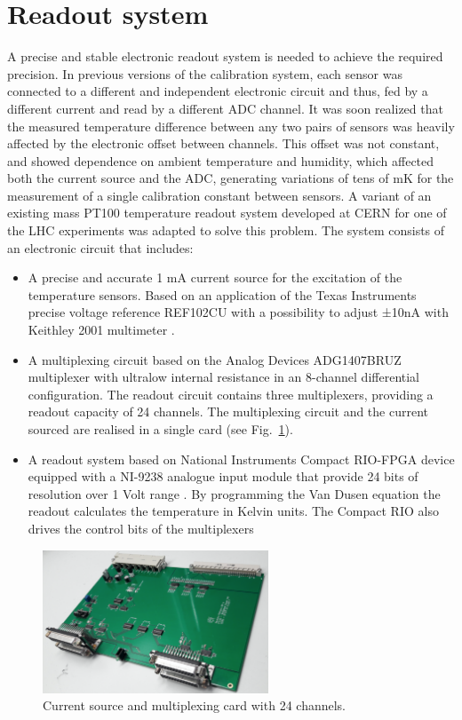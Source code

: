 \section{Readout system}
\label{sec:readout}
A precise and stable electronic readout system is needed to achieve the required precision. In previous versions of the calibration system, each sensor was connected to a different and independent electronic circuit and thus, fed by a different current and read by a different ADC channel. It was soon realized that the measured temperature difference between any two pairs of sensors was heavily affected by the electronic offset between channels. This offset was not constant, and showed dependence on ambient temperature and humidity, which affected both the current source and the ADC, generating variations of tens of mK for the measurement of a single calibration constant between sensors. A variant of an existing mass PT100 temperature readout system developed at CERN for one of the LHC experiments \cite{bib:multiplexing_board} was adapted to solve this problem. The system consists of an electronic circuit that includes:

\begin{itemize}
\item A precise and accurate 1 mA current source for the excitation of the temperature sensors. Based on an application of the Texas Instruments precise voltage reference REF102CU with a possibility to adjust ±10nA with Keithley 2001 multimeter \cite{xavier,keithley}.%
\item A multiplexing circuit based on the Analog Devices ADG1407BRUZ multiplexer with ultralow internal resistance in an 8-channel differential configuration. The readout circuit contains three multiplexers, providing a readout capacity of 24 channels. The multiplexing circuit and the current sourced are realised in a single card (see Fig.~\ref{fig:readout}). 
\item A readout system based on National Instruments Compact RIO-FPGA device \cite{compactrio} equipped with a NI-9238 analogue input module that provide 24 bits of resolution over 1 Volt range \cite{ni9238}. By programming the Van Dusen equation the readout calculates the temperature in Kelvin units. The Compact RIO also drives the control bits of the multiplexers
\end{itemize}

\begin{figure}[htbp]
\centering
\includegraphics[width=0.6\textwidth]{images/figure_2.png}
\caption{Current source and multiplexing card with 24 channels. 
\label{fig:readout}}
\end{figure}

